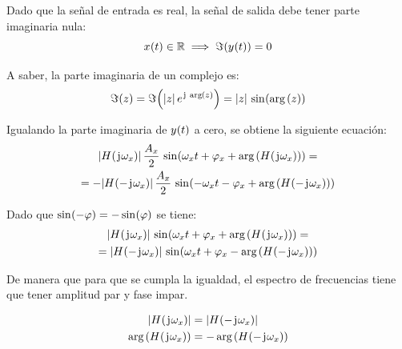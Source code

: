 Dado que la señal de entrada es real, la señal de salida debe tener parte imaginaria nula:
\begin{equation*}
    \fx[x]{t} \in \setR \implies \fx[\Im]{\fx[y]{t}} = 0
\end{equation*}

A saber, la parte imaginaria de un complejo es:
\begin{equation*}
    \fx[\Im]{z} = \fx[\Im]{\norm{z} \, e^{\iu \, \fx[\arg]{z}}}
    = \norm{z} \, \fx[\sin]{\fx[\arg]{z}}
\end{equation*}

Igualando la parte imaginaria de $\fx[y]{t}$ a cero, se obtiene la siguiente ecuación:
\begin{multline*}
    \norm{\fx[H]{\iu \omega_x}}
    \, \frac{A_x}{2}
    \, \fx[\sin]{\omega_x t + \varphi_x + \fx[\arg]{\fx[H]{\iu \omega_x}}}
    =
    \\
    =
    - \norm{\fx[H]{- \iu \omega_x}}
    \, \frac{A_x}{2}
    \, \fx[\sin]{- \omega_x t - \varphi_x + \fx[\arg]{\fx[H]{- \iu \omega_x}}}
\end{multline*}

Dado que $\fx[\sin]{-\varphi} = - \fx[\sin]{\varphi}$ se tiene:
\begin{multline*}
    \norm{\fx[H]{\iu \omega_x}}
    \, \fx[\sin]{\omega_x t + \varphi_x + \fx[\arg]{\fx[H]{\iu \omega_x}}}
    =
    \\
    =
    \norm{\fx[H]{- \iu \omega_x}}
    \, \fx[\sin]{\omega_x t + \varphi_x - \fx[\arg]{\fx[H]{- \iu \omega_x}}}
\end{multline*}

De manera que para que se cumpla la igualdad, el espectro de frecuencias tiene que tener amplitud par y fase impar.

\begin{mdframed}[style=PropertyFrame]
    \begin{prop}
    \end{prop}
    \begin{align*}
        \norm{\fx[H]{\iu \omega_x}} & = \norm{\fx[H]{- \iu \omega_x}}
        \\
        \fx[\arg]{\fx[H]{\iu \omega_x}} & = - \fx[\arg]{\fx[H]{- \iu \omega_x}}
    \end{align*}
\end{mdframed}

